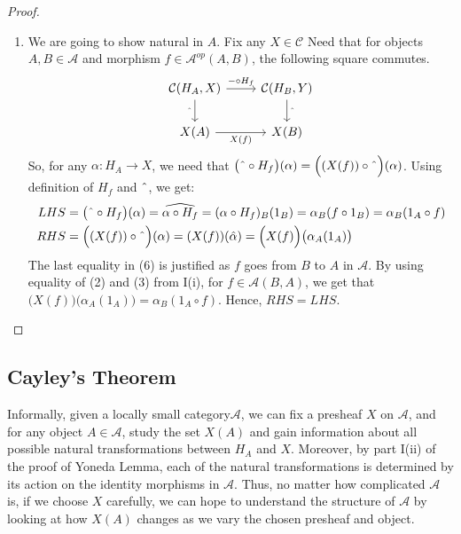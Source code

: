 \documentclass[18pt,a4paper]{article}
\theoremstyle{definition}
\begin{document}
\begin{proof}
\begin{enumerate}[label=\Roman*]
\begin{enumerate}[label=(\roman*)]
					\item We are going to show natural in $A$. Fix any $X \in \mathcal{C} $ Need that
						for objects $A,B \in \mathcal{A} $ and morphism $f\in \mathcal{A} ^{op}(A,B)$,
						the following square commutes.
						\begin{equation*}
							\begin{tikzcd}
								\mathcal{C}(H_A,X) \arrow[swap]{d}{ \string ^}
								\arrow{r}{- \circ H_f}
			& \mathcal{C}(H_B,Y) \arrow{d}{\string ^}\\
			X(A) \arrow[swap]{r}{X(f)}
			& X(B)
							\end{tikzcd}
						\end{equation*}
						So, for any $\alpha:H_A \to X$, we need that
						$\big( \string ^ \circ H_f \big)(\alpha)=\Big((X(f)) \circ \string ^ \Big)(\alpha) $.
						Using definition of $H_f$ and $\string ^$, we get:
						\begin{align}
							LHS&=\big( \string ^ \circ H_f \big)(\alpha)= \widehat{\alpha \circ H_f}
							=(\alpha \circ H_f)_B (1_B) = \alpha_B (f \circ 1_B) = \alpha_B(1_A \circ f) \\
							RHS&=\Big((X(f)) \circ \string ^ \Big)(\alpha)
							= (X(f))(\hat{\alpha})= \Big(X(f) \Big)\big(\alpha_A(1_A)\big)
						\end{align}
						The last equality in (6) is justified as $f$ goes from $B$ to
						$A$ in $\mathcal{A} $. By using equality of (2) and (3) from I(i), for
						$f \in \mathcal{A}(B,A)$, we get that
						$\Big(X(f) \Big)\big(\alpha_A(1_A)\big)=\alpha_B( 1_A \circ f) $.
						Hence, $RHS=LHS$. \qedhere
				\end{enumerate}
		\end{enumerate}
	\end{proof}
	\subsection{Cayley's Theorem}%
	Informally, given a locally small category$\mathcal{A} $, we can fix a presheaf $X$ on $\mathcal{A}$,
	and for any object $A \in \mathcal{A} $, study the set $X(A)$ and gain information
	about all possible natural transformations between $H_A$ and $X$. Moreover, by part I(ii) of the
	proof of Yoneda Lemma, each of the natural transformations is determined by its action
	on the identity morphisms in $\mathcal{A}$. Thus, no matter how complicated $\mathcal{A}$ is, if we choose $X$ carefully, we can hope to understand the structure of $\mathcal{A} $
	by looking at how $X(A)$ changes as we vary the chosen
	presheaf and object.
\end{document}
